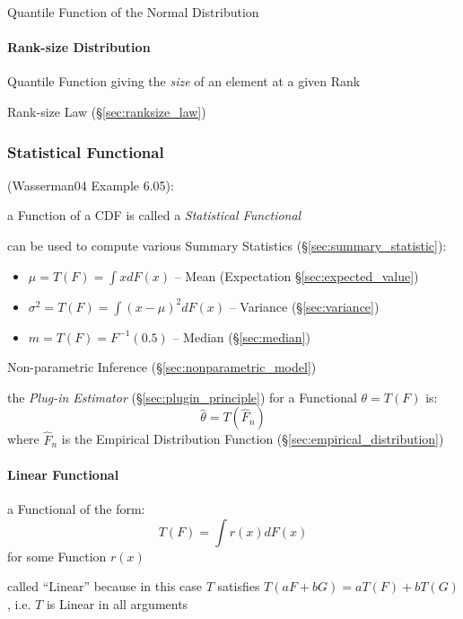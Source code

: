 Quantile Function of the Normal Distribution



\paragraph{Rank-size Distribution}\label{sec:rank_size}\hfill

Quantile Function giving the \emph{size} of an element at a given Rank

\fist Rank-size Law (\S\ref{sec:ranksize_law})



\subsubsection{Statistical Functional}\label{sec:statistical_functional}

(Wasserman04 Example 6.05):

a Function of a CDF is called a \emph{Statistical Functional}

can be used to compute various Summary Statistics
(\S\ref{sec:summary_statistic}):
\begin{itemize}
  \item $\mu = T(F) = \int x dF(x)$
    -- Mean (Expectation \S\ref{sec:expected_value})
  \item $\sigma^2 = T(F) = \int (x - \mu)^2 dF(x)$
    -- Variance (\S\ref{sec:variance})
  \item $m = T(F) = F^{-1}(0.5)$
    -- Median (\S\ref{sec:median})
\end{itemize}

Non-parametric Inference (\S\ref{sec:nonparametric_model})

the \emph{Plug-in Estimator} (\S\ref{sec:plugin_principle}) for a Functional
$\theta = T(F)$ is:
\[
  \hat{\theta} = T(\hat{F}_n)
\]
where $\hat{F}_n$ is the Empirical Distribution Function
(\S\ref{sec:empirical_distribution})



\paragraph{Linear Functional}\label{sec:linear_functional}\hfill

a Functional of the form:
\[
  T(F) = \int r(x) dF(x)
\]
for some Function $r(x)$

called ``Linear'' because in this case $T$ satisfies
$T(aF + bG) = aT(F) + bT(G)$, i.e. $T$ is Linear in all arguments

